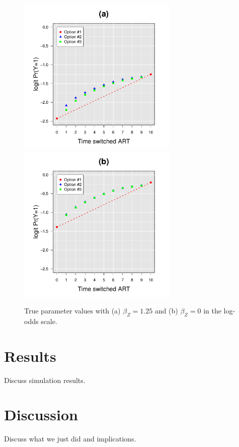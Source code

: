 \documentclass{article}\usepackage[]{graphicx}\usepackage[]{color}
\begin{document}
\begin{figure}[htbp]
\centering
    \includegraphics[width=3in]{truePsi_ZaffectsY} 
    \includegraphics[width=3in]{truePsi_noZaffectsY} 
    \caption{True parameter values with (a) $\beta_Z=1.25$ and (b)
    $\beta_Z=0$ in the log-odds scale.}
    \label{fig:parms}
\end{figure}


\section{Results}

Discuss simulation results.


\section{Discussion}

Discuss what we just did and implications.


%
%
\end{document}
